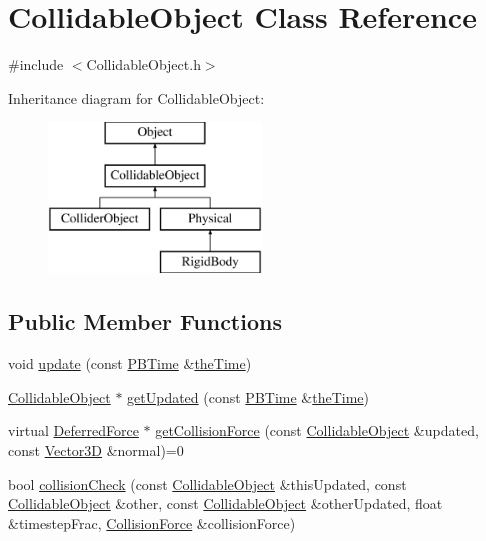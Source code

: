 \hypertarget{class_collidable_object}{\section{Collidable\-Object Class Reference}
\label{class_collidable_object}
}


{\ttfamily \#include $<$Collidable\-Object.\-h$>$}

Inheritance diagram for Collidable\-Object\-:\begin{figure}[H]
\begin{center}
\leavevmode
\includegraphics[height=4.000000cm]{class_collidable_object}
\end{center}
\end{figure}
\subsection*{Public Member Functions}
\begin{DoxyCompactItemize}
\item 
void \hyperlink{class_collidable_object_a3c8c31daabe129b6b7accb1759409a7b}{update} (const \hyperlink{class_p_b_time}{P\-B\-Time} \&\hyperlink{_physically_based_8h_a766da334af281a8fa1ed5cf404d0ec45}{the\-Time})
\item 
\hyperlink{class_collidable_object}{Collidable\-Object} $\ast$ \hyperlink{class_collidable_object_ab5a14a6929cecb22e3627f5e992bec36}{get\-Updated} (const \hyperlink{class_p_b_time}{P\-B\-Time} \&\hyperlink{_physically_based_8h_a766da334af281a8fa1ed5cf404d0ec45}{the\-Time})
\item 
virtual \hyperlink{class_deferred_force}{Deferred\-Force} $\ast$ \hyperlink{class_collidable_object_ad1ad2104aa96351a206ffe6540d84090}{get\-Collision\-Force} (const \hyperlink{class_collidable_object}{Collidable\-Object} \&updated, const \hyperlink{class_vector3_d}{Vector3\-D} \&normal)=0
\item 
bool \hyperlink{class_collidable_object_a3924392b72a5395d5327804d7700090d}{collision\-Check} (const \hyperlink{class_collidable_object}{Collidable\-Object} \&this\-Updated, const \hyperlink{class_collidable_object}{Collidable\-Object} \&other, const \hyperlink{class_collidable_object}{Collidable\-Object} \&other\-Updated, float \&timestep\-Frac, \hyperlink{class_collision_force}{Collision\-Force} \&collision\-Force)
\end{DoxyCompactItemize}
